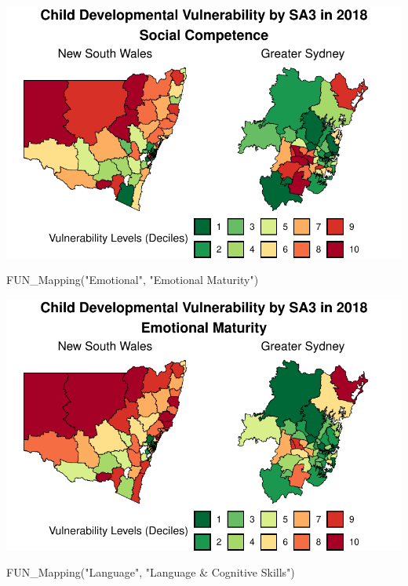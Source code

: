 \documentclass[
  letterpaper,
  DIV=11,
  numbers=noendperiod]{scrartcl}
\newenvironment{Shaded}{\begin{snugshade}}{\end{snugshade}}
\newcommand{\FunctionTok}[1]{\textcolor[rgb]{0.28,0.35,0.67}{#1}}
\newcommand{\NormalTok}[1]{\textcolor[rgb]{0.00,0.23,0.31}{#1}}
\newcommand{\StringTok}[1]{\textcolor[rgb]{0.13,0.47,0.30}{#1}}
\begin{document}
\includegraphics{variable_def_and_maps_files/figure-pdf/maps-AEDC-2.pdf}

\begin{Shaded}
\begin{Highlighting}[]
\FunctionTok{FUN\_Mapping}\NormalTok{(}\StringTok{"Emotional"}\NormalTok{, }\StringTok{"Emotional Maturity"}\NormalTok{)}
\end{Highlighting}
\end{Shaded}

\includegraphics{variable_def_and_maps_files/figure-pdf/maps-AEDC-3.pdf}

\begin{Shaded}
\begin{Highlighting}[]
\FunctionTok{FUN\_Mapping}\NormalTok{(}\StringTok{"Language"}\NormalTok{, }\StringTok{"Language \& Cognitive Skills"}\NormalTok{)}
\end{Highlighting}
\end{Shaded}
\end{document}
